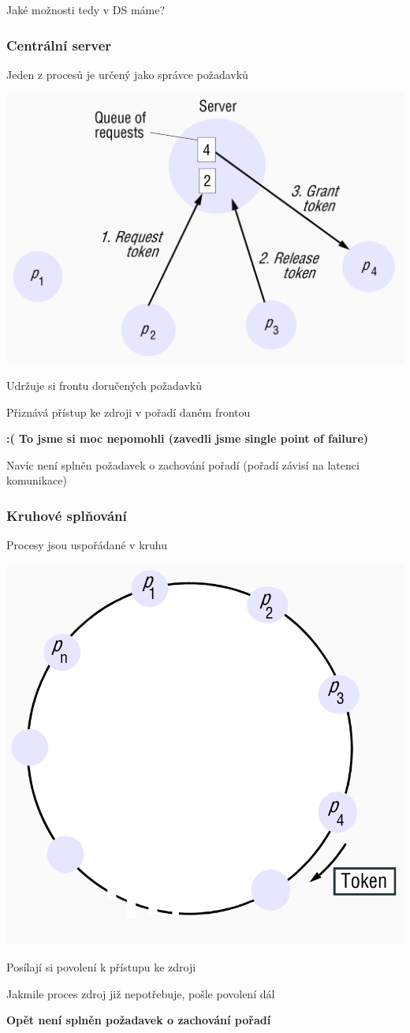 \documentclass[usenames,dvipsnames,9pt]{beamer}
\begin{document}
\begin{frame}

    \begin{center}
    \LARGE Jaké možnosti tedy v DS máme?
  \end{center}


\end{frame}

\begin{frame}
\frametitle{Centrální server}

Jeden z procesů je určený jako správce požadavků

\begin{center}
\includegraphics[width=.5\linewidth]{11/figs/central.png}
\end{center}

Udržuje si frontu doručených požadavků

Přiznává přístup ke zdroji v pořadí daném frontou

\pause\vspace{1em}

\hfill\small\bf\textcolor{BrickRed}{:(} To jsme si moc nepomohli (zavedli jsme single point of failure)

\hfill Navíc není splněn požadavek o zachování pořadí (pořadí závisí na latenci komunikace)


\end{frame}

\begin{frame}
\frametitle{Kruhové splňování}

Procesy jsou uspořádané v kruhu

\begin{center}
\includegraphics[width=.35\linewidth]{11/figs/circle.png}
\end{center}

Posílají si povolení k přístupu ke zdroji

Jakmile proces zdroj již nepotřebuje, pošle povolení dál

\vspace{1em}

\hfill\small\bf Opět není splněn požadavek o zachování pořadí


\end{frame}
\end{document}
